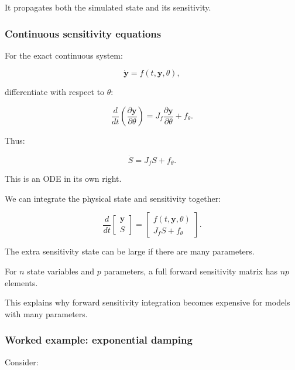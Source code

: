 It propagates both the simulated state and its sensitivity.

\subsubsection{Continuous sensitivity equations}\label{02-foundations-ii-ch022-continuous-sensitivity-equations}

\hypertarget{02-foundations-ii-ch022-continuous-sensitivity-equations}{}

For the exact continuous system:

\[
\dot{\mathbf y}=f(t,\mathbf y,\theta),
\]

differentiate with respect to \(\theta\):

\[
\frac{d}{dt} \left( \frac{\partial\mathbf y}{\partial\theta} \right) = J_f \frac{\partial\mathbf y}{\partial\theta} + f_\theta.
\]

Thus:

\[
\boxed{ \dot S=J_fS+f_\theta }.
\]

This is an ODE in its own right.

We can integrate the physical state and sensitivity together:

\[
\frac d{dt} \begin{bmatrix} \mathbf y\\S \end{bmatrix} = \begin{bmatrix} f(t,\mathbf y,\theta)\\ J_fS+f_\theta \end{bmatrix}.
\]

The extra sensitivity state can be large if there are many parameters.

For \(n\) state variables and \(p\) parameters, a full forward sensitivity matrix has \(np\) elements.

This explains why forward sensitivity integration becomes expensive for models with many parameters.

\begin{allmightroleexample}

\subsubsection{Worked example: exponential damping}\label{02-foundations-ii-ch022-worked-example-exponential-damping}

\hypertarget{02-foundations-ii-ch022-worked-example-exponential-damping}{}

Consider:

\end{allmightroleexample}

